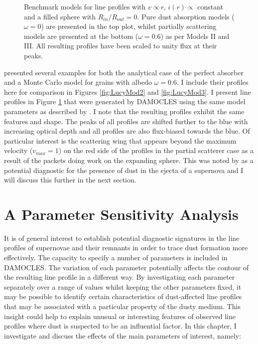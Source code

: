 \begin{figure}
\begin{subfigure}{\textwidth}
\end{subfigure}  
\caption{Benchmark models for line profiles  with $v \propto r$, $i(r) \propto$ constant and a filled sphere with $R_{in}/R_{out}=0$.  Pure dust absorption models ($\omega = 0$) are presented in the top plot, whilst partially scattering models are presented at the bottom ($\omega = 0.6$) as per \citet{Lucy1989} Models II and III. All resulting profiles have been scaled to unity flux at their peaks.}
\label{fig:Lucy}
\end{figure}


\citet{Lucy1989} presented several examples for both the analytical case of 
the perfect absorber and a Monte Carlo model for grains with albedo $\omega 
=0.6$.  I include their profiles here for comparison in Figures \ref{fig:LucyMod2} and \ref{fig:LucyMod3}.  I  present line profiles in Figure \ref{fig:Lucy} that were generated by DAMOCLES using the same model parameters as described by \citet{Lucy1989}.  I note that 
the resulting profiles exhibit the same features and shape. The peaks of all profiles are shifted further to the blue with increasing optical depth and all profiles are also flux-biased towards the blue.  Of particular 
interest is the scattering wing that appears beyond the maximum velocity 
($v_{max}=1$) on the red side of the profiles in the partial 
scatterer case as a result of the packets doing work on the expanding sphere.  
This was noted by \citet{Lucy1989} as a potential diagnostic for the 
presence of dust in the ejecta of a supernova and I  will discuss this 
further in the next section.




\section{A Parameter Sensitivity Analysis}
It is of general interest to establish potential diagnostic signatures in 
the line profiles of supernovae and their remnants in order to trace dust 
formation more effectively. The capacity to specify a number of parameters is included in DAMOCLES.  The variation of each parameter potentially affects the contour of the resulting line profile in a different way.  By investigating each parameter separately over a range of values whilst keeping the other parameters fixed, it may be possible to identify certain characteristics of dust-affected line profiles that may be associated with a particular property of the dusty medium.  This insight could help to explain unusual or interesting features of observed line profiles where dust is suspected to be an influential factor.  In this chapter, I investigate and discuss the effects of the main 
parameters of interest, namely:

